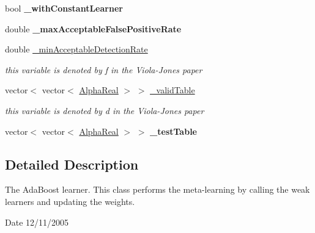\begin{DoxyCompactItemize}
\item 
\hypertarget{classMultiBoost_1_1VJCascadeLearner_a6ca1d43f79050709bbabca865fe5c38b}{bool {\bfseries \-\_\-with\-Constant\-Learner}}\label{classMultiBoost_1_1VJCascadeLearner_a6ca1d43f79050709bbabca865fe5c38b}

\item 
\hypertarget{classMultiBoost_1_1VJCascadeLearner_a77586e2117b685f82d975cbca6c4ce3d}{double {\bfseries \-\_\-max\-Acceptable\-False\-Positive\-Rate}}\label{classMultiBoost_1_1VJCascadeLearner_a77586e2117b685f82d975cbca6c4ce3d}

\item 
\hypertarget{classMultiBoost_1_1VJCascadeLearner_ad00629caf09b515af5808404f3834eb5}{double \hyperlink{classMultiBoost_1_1VJCascadeLearner_ad00629caf09b515af5808404f3834eb5}{\-\_\-min\-Acceptable\-Detection\-Rate}}\label{classMultiBoost_1_1VJCascadeLearner_ad00629caf09b515af5808404f3834eb5}

\begin{DoxyCompactList}\small\item\em this variable is denoted by f in the Viola-\/\-Jones paper \end{DoxyCompactList}\item 
\hypertarget{classMultiBoost_1_1VJCascadeLearner_a8ab2a0ab783db146667b2cddf32ccafd}{vector$<$ vector$<$ \hyperlink{Defaults_8h_a80184c4fd10ab70a1a17c5f97dcd1563}{Alpha\-Real} $>$ $>$ \hyperlink{classMultiBoost_1_1VJCascadeLearner_a8ab2a0ab783db146667b2cddf32ccafd}{\-\_\-valid\-Table}}\label{classMultiBoost_1_1VJCascadeLearner_a8ab2a0ab783db146667b2cddf32ccafd}

\begin{DoxyCompactList}\small\item\em this variable is denoted by d in the Viola-\/\-Jones paper \end{DoxyCompactList}\item 
\hypertarget{classMultiBoost_1_1VJCascadeLearner_a0e2d39e2086cfba7f8cdcd3df399ee33}{vector$<$ vector$<$ \hyperlink{Defaults_8h_a80184c4fd10ab70a1a17c5f97dcd1563}{Alpha\-Real} $>$ $>$ {\bfseries \-\_\-test\-Table}}\label{classMultiBoost_1_1VJCascadeLearner_a0e2d39e2086cfba7f8cdcd3df399ee33}

\end{DoxyCompactItemize}


\subsection{Detailed Description}
The Ada\-Boost learner. This class performs the meta-\/learning by calling the weak learners and updating the weights. \begin{DoxyDate}{Date}
12/11/2005 
\end{DoxyDate}


